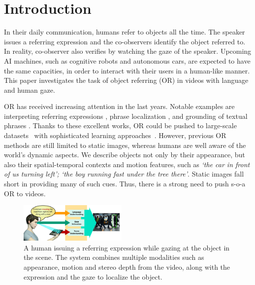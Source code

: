 \documentclass[10pt,twocolumn,letterpaper]{article}
\begin{document}
%

\section{Introduction}
\label{sec:intro}

In their daily communication, humans refer to objects all the
time. The speaker issues a referring expression and the co-observers
identify the object referred to. In reality, co-observer also verifies
by watching the gaze of the speaker. Upcoming AI machines, such as
cognitive robots and autonomous cars, are expected to have the same
capacities, in order to interact with their users in a human-like
manner.  This paper investigates the task of object referring (OR) in
videos with language and human gaze.

OR has received increasing attention in the last years. Notable
examples are interpreting referring expressions
\cite{yu2016modeling,mao2016generation}, phrase localization
\cite{phloc,wang2016structured}, and grounding of textual phrases
\cite{rohrbach2016grounding}. Thanks to these excellent works, OR
could be pushed to large-scale
datasets~\cite{kazemzadeh2014referitgame, mao2016generation,
  yu2016modeling} with sophisticated learning
approaches~\cite{mao2016generation,hu2016natural,Nagaraja2016,
  phloc,wang2016structured}. However, previous OR methods are still
limited to static images, whereas humans are well aware of the world's
dynamic aspects.  We describe objects not only by their appearance,
but also their spatial-temporal contexts and motion features, such as
\emph{`the car in front of us turning left'; `the boy running fast
  under the tree there'}.
Static images fall short in providing many of such cues. Thus, there is a strong need to push s-o-a OR to videos. 

\begin{figure}[!tb]
  \centering
  \includegraphics[width=0.47\textwidth]{teaser_w.jpg}%
   \caption{A human issuing a referring expression while gazing at the object in the scene. The system combines multiple modalities such as appearance, motion and stereo depth from the video, along with the expression and the gaze to localize the object.}
  \label{fig:teaser}
\end{figure} 
\end{document}
